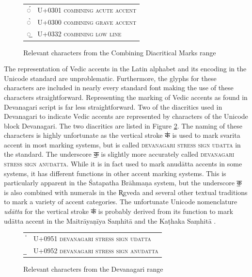 \begin{figure}[!ht]
\begin{center}
\begin{tabular}{ll}
  ◌́& U+0301 \textsc{combining acute accent}\\
  ◌̀& U+0300 \textsc{combining grave accent}\\
  ◌̲& U+0332 \textsc{combining low line}
\end{tabular}
\end{center}
\caption[Relevant characters from the Combining Diacritical Marks range]{\label{tab:unilat}Relevant characters from the Combining Diacritical Marks range}
\end{figure}

The representation of Vedic accents in the Latin alphabet and its encoding in the Unicode standard are unproblematic. Furthermore, the glyphs for these characters are included in nearly every standard font making the use of these characters straightforward. Representing the marking of Vedic accents as found in Devanagari script is far less straightforward. Two of the diacritics used in Devanagari to indicate Vedic accents are represented by characters of the Unicode block Devanagari. The two diacritics are listed in Figure \ref{tab:unidev}. The naming of these characters is highly unfortunate as the vertical stroke {\devfont क॑} is used to mark svarita accent in most marking systems, but is called \textsc{devanagari stress sign udatta} in the standard. The underscore {\devfont क॒} is slightly more accurately called \textsc{devanagari stress sign anudatta}. While it is in fact used to mark anudātta accents in some systems, it has different functions in other accent marking systems. This is particularly apparent in the Śatapatha Brāhmaṇa system, but the underscore {\devfont क॒} is also combined with numerals in the R̥gveda and several other textual traditions \citep[p.~159]{ScharfHyman2011} to mark a variety of accent categories. The unfortunate Unicode nomenclature \emph{udātta} for the vertical stroke {\devfont क॑} is probably derived from its function to mark udātta accent in the Maitrāyaṇīya Saṃhitā and the Kaṭhaka Saṃhitā \citep[p.~450]{Macdonell1916}.

\begin{figure}[ht]
\begin{center}
\begin{tabular}{ll}
  {\devfont 	॑}& U+0951 \textsc{devanagari stress sign udatta}\\
  {\devfont 	॒}& U+0952 \textsc{devanagari stress sign anudatta}
\end{tabular}
\end{center}
\caption[Relevant characters from the Devanagari range]{\label{tab:unidev}Relevant characters from the Devanagari range}
\end{figure}

